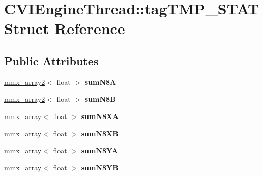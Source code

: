 \hypertarget{struct_c_v_i_engine_thread_1_1tag_t_m_p___s_t_a_t}{\section{C\+V\+I\+Engine\+Thread\+:\+:tag\+T\+M\+P\+\_\+\+S\+T\+A\+T Struct Reference}
\label{struct_c_v_i_engine_thread_1_1tag_t_m_p___s_t_a_t}
}
\subsection*{Public Attributes}
\begin{DoxyCompactItemize}
\item 
\hypertarget{struct_c_v_i_engine_thread_1_1tag_t_m_p___s_t_a_t_a6c0472a126415ba66980138167200ee1}{\hyperlink{classmmx__array2}{mmx\+\_\+array2}$<$ float $>$ {\bfseries sum\+N8\+A}}\label{struct_c_v_i_engine_thread_1_1tag_t_m_p___s_t_a_t_a6c0472a126415ba66980138167200ee1}

\item 
\hypertarget{struct_c_v_i_engine_thread_1_1tag_t_m_p___s_t_a_t_ae90f5230a0ab3cdda9f8952d2643bc2b}{\hyperlink{classmmx__array2}{mmx\+\_\+array2}$<$ float $>$ {\bfseries sum\+N8\+B}}\label{struct_c_v_i_engine_thread_1_1tag_t_m_p___s_t_a_t_ae90f5230a0ab3cdda9f8952d2643bc2b}

\item 
\hypertarget{struct_c_v_i_engine_thread_1_1tag_t_m_p___s_t_a_t_a42baad2ced89f599cbb1a1c393657a5e}{\hyperlink{classmmx__array}{mmx\+\_\+array}$<$ float $>$ {\bfseries sum\+N8\+X\+A}}\label{struct_c_v_i_engine_thread_1_1tag_t_m_p___s_t_a_t_a42baad2ced89f599cbb1a1c393657a5e}

\item 
\hypertarget{struct_c_v_i_engine_thread_1_1tag_t_m_p___s_t_a_t_afc12e71a53d3c48e1cdffcd0a87a6e25}{\hyperlink{classmmx__array}{mmx\+\_\+array}$<$ float $>$ {\bfseries sum\+N8\+X\+B}}\label{struct_c_v_i_engine_thread_1_1tag_t_m_p___s_t_a_t_afc12e71a53d3c48e1cdffcd0a87a6e25}

\item 
\hypertarget{struct_c_v_i_engine_thread_1_1tag_t_m_p___s_t_a_t_ab51541bbc40f9e0e4a29beb43e8616e1}{\hyperlink{classmmx__array}{mmx\+\_\+array}$<$ float $>$ {\bfseries sum\+N8\+Y\+A}}\label{struct_c_v_i_engine_thread_1_1tag_t_m_p___s_t_a_t_ab51541bbc40f9e0e4a29beb43e8616e1}

\item 
\hypertarget{struct_c_v_i_engine_thread_1_1tag_t_m_p___s_t_a_t_a6528ccd41f3f8149da880e6d6ce20b08}{\hyperlink{classmmx__array}{mmx\+\_\+array}$<$ float $>$ {\bfseries sum\+N8\+Y\+B}}\label{struct_c_v_i_engine_thread_1_1tag_t_m_p___s_t_a_t_a6528ccd41f3f8149da880e6d6ce20b08}


\end{DoxyCompactItemize}
